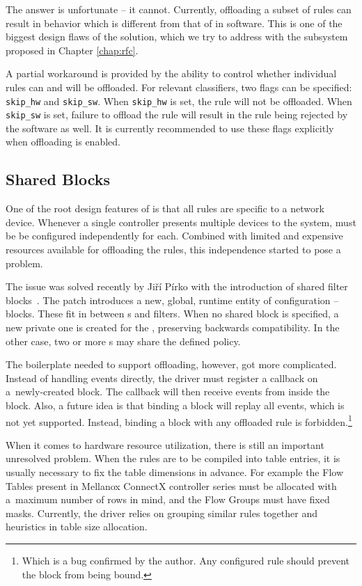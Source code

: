 The answer is unfortunate -- it cannot. Currently, offloading a subset of rules
can result in behavior which is different from that of  in software. This
is one of the biggest design flaws of the solution, which we try to address
with the subsystem proposed in Chapter \ref{chap:rfc}.

A partial workaround is provided by the ability to control whether individual rules
can and will be offloaded. For relevant classifiers, two flags can be specified:
\texttt{skip\_hw} and \texttt{skip\_sw}. When \texttt{skip\_hw} is set, the
rule will not be offloaded. When \texttt{skip\_sw} is set, failure to offload
the rule will result in the rule being rejected by the software as well.
It is currently recommended to use these flags explicitly when 
offloading is enabled.

\subsection{Shared Blocks}
\label{sec:tc-shared-blocks}

One of the root design features of  is that all rules are specific to
a network device. Whenever a single controller presents multiple devices to the
system,  must be be configured independently for each. Combined with
limited and expensive resources available for offloading the  rules, this
independence started to pose a problem.

The issue was solved recently by Jiří Pírko with the introduction of shared filter
blocks~\cite{linux-shared-blocks}. The patch introduces a new, global, runtime
entity of  configuration -- blocks. These fit in between \qdisc{}s and
filters. When no shared block is specified, a new private one is created for the
\qdisc{}, preserving backwards compatibility. In the other case, two or more
\qdisc{}s may share the defined policy.

The boilerplate needed to support  offloading, however, got more
complicated. Instead of handling events directly, the driver must register
a callback on a~newly-created block. The callback will then receive events from
inside the block. Also, a future idea is that binding a block will replay all
events, which is not yet supported. Instead, binding a block with any offloaded
rule is forbidden.\footnote{Which is a bug confirmed by the author. Any
configured rule should prevent the block from being bound.}

When it comes to hardware resource utilization, there is still an important
unresolved problem. When the rules are to be compiled into table entries, it is
usually necessary to fix the table dimensions in advance. For example the Flow
Tables present in Mellanox ConnectX controller series must be allocated with
a~maximum number of rows in mind, and the Flow Groups must have fixed masks.
Currently, the driver relies on grouping similar rules together and heuristics
in table size allocation.
